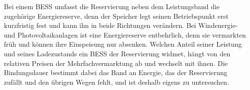 Bei einem \ac{BESS} umfasst die Reservierung neben dem Leistungsband die zugehörige Energiereserve, denn der Speicher legt seinen Betriebspunkt erst kurzfristig fest und kann ihn in beide Richtungen verändern.
Bei Windenergie- und Photovoltaikanlagen ist eine Energiereserve entbehrlich, denn sie vermarkten früh und können ihre Einspeisung nur absenken.
Welchen Anteil seiner Leistung und seines Ladezustands ein \ac{BESS} der Reservierung widmet, hängt von den relativen Preisen der Mehrfachvermarktung ab und wechselt mit ihnen.
Die Bindungsdauer bestimmt dabei das Band an Energie, das der Reservierung zufällt und den übrigen Wegen fehlt, und ist deshalb eigens zu untersuchen.
